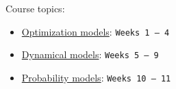 \documentclass{workbook}
\begin{document}
\begin{slide}

\begin{parts}
\setcounter{partsitem}{2}

	\item Course topics:

\begin{itemize}
	\item \hyperref[sec:optimization]{Optimization models}: \texttt{Weeks 1 -- 4}
	\item \hyperref[sec:dynamical]{Dynamical models}: \texttt{Weeks 5 -- 9}
	\item \hyperref[sec:probability]{Probability models}: \texttt{Weeks 10 -- 11}
\end{itemize}
	
\end{parts}

\end{slide}






%
%
%
%

{}\label{sec:optimization}








%
%
%
%

{}\label{sec:dynamical}









%
%
%
%

{}\label{sec:probability}


\end{document}
